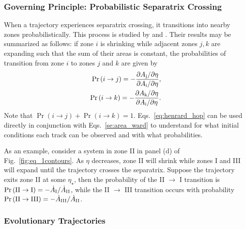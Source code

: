 \documentclass[
        fleqn,
        usenatbib,
    ]{mnras}
\newcommand*{\pdil}[2]{\partial#1 / \partial#2}
\newcommand*{\p}[1]{\left(#1\right)}
\begin{document}
\subsubsection{Governing Principle: Probabilistic Separatrix Crossing}

When a trajectory experiences separatrix crossing, it transitions into nearby
zones probabilistically. This process is studied by \citet{henrard1982} and
\citet{henrard1987}. Their results may be summarized as follows: if zone $i$
is shrinking while adjacent zones $j, k$ are expanding such that the sum of
their areas is constant, the probabilities of transition from zone $i$ to zones
$j$ and $k$ are given by
\begin{subequations}\label{eq:henrard_hop}
    \begin{align}
        \Pr\p{i \to j} = -\frac{\pdil{A_{\rm j}}{\eta}}{\pdil{A_{\rm i}}{\eta}},
                \\
        \Pr\p{i \to k} = -\frac{\pdil{A_{\rm k}}{\eta}}{\pdil{A_{\rm i}}{\eta}}.
    \end{align}
\end{subequations}
Note that $\Pr \p{i \to j} + \Pr\p{i \to k} = 1$.
Eqs.~\eqref{eq:henrard_hop} can be used directly in conjunction with
Eqs.~\eqref{se:area_ward} to understand for what initial conditions each track
can be observed and with what probabilities.

As an example, consider a system in zone II in panel (d) of
Fig.~\ref{fig:eq_1contours}. As $\eta$ decreases, zone II will shrink while
zones I and III will expand until the trajectory crosses the separatrix. Suppose
the trajectory exits zone II at some $\eta_\star$, then the probability of the
II $\to$ I transition is $\Pr\p{\rm II \to I} = -\dot{A}_{\rm I} / \dot{A}_{\rm
II}$, while the II $\to$ III transition occurs with probability $\Pr\p{\rm II
\to III} = -\dot{A}_{\rm III} / \dot{A}_{\rm II}$.

\subsubsection{Evolutionary Trajectories}\label{sss:evol_traj}
\end{document}
